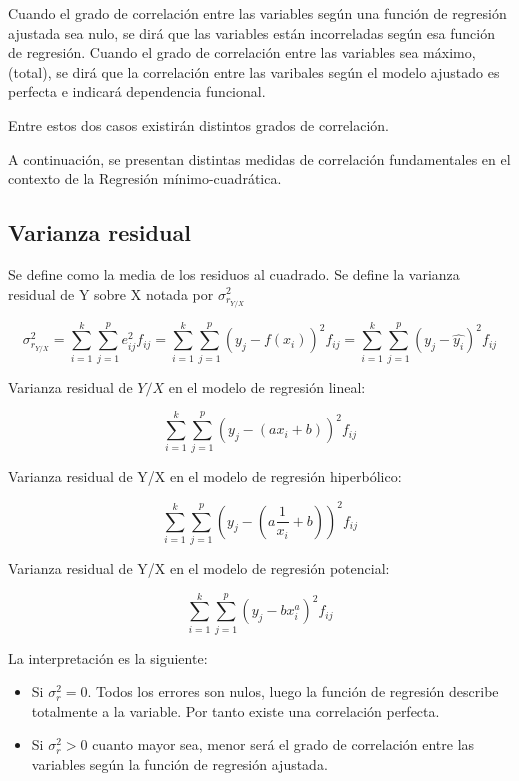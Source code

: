 \documentclass{article}
\theoremstyle{definition}
\begin{document}
 Cuando el grado de correlación entre las variables según una función de regresión ajustada sea nulo, se dirá que las variables están incorreladas según esa función de regresión. Cuando el grado de correlación entre las variables sea máximo, (total), se dirá que la correlación entre las varibales según el modelo ajustado es perfecta e indicará dependencia funcional.

Entre estos dos casos existirán distintos grados de correlación.

A continuación, se presentan distintas medidas de correlación fundamentales en el
contexto de la Regresión mínimo-cuadrática.

\subsection{Varianza residual}

Se define como la media de los residuos al
cuadrado. Se define la varianza residual de Y sobre X notada por $\sigma_{r_{Y/X}}^2 $

$$
\sigma_{r_{Y/X}}^2 =
	\sum_{i=1}^k \sum_{j=1}^p e_{ij}^2 f_{ij} =
	\sum_{i=1}^k \sum_{j=1}^p {(y_j - f(x_i))}^2 f_{ij} =
	\sum_{i=1}^k \sum_{j=1}^p {(y_j -\hat{y_i})}^2 f_{ij}
$$

Varianza residual de $Y/X$ en el modelo de regresión lineal:

$$ \sum_{i=1}^k \sum_{j=1}^p {(y_j - (ax_i +b))}^2 f_{ij} $$

Varianza residual de Y/X en el modelo de regresión hiperbólico:

$$ \sum_{i=1}^k \sum_{j=1}^p {(y_j - (a\frac{1}{x_i} +b))}^2 f_{ij} $$

Varianza residual de Y/X en el modelo de regresión potencial:

$$\sum_{i=1}^k \sum_{j=1}^p {(y_j - bx_i^a)}^2 f_{ij} $$

La interpretación es la siguiente:

\begin{itemize}
\item Si $\sigma_r^2 = 0$. Todos los errores son nulos, luego la función de
  regresión describe totalmente a la variable. Por tanto existe una correlación
  perfecta.
\item Si $\sigma_r^2 > 0$ cuanto mayor sea, menor será el grado de correlación
entre las variables según la función de regresión ajustada.
\end{itemize}

\vspace{2mm}
\end{document}
